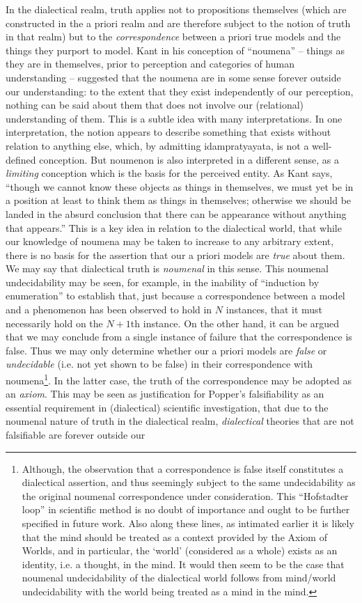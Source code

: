 \documentclass[pra,twocolumn,groupedaddress,10pt]{revtex4}
\theoremstyle{definition}
\begin{document}
In the dialectical realm, truth applies not to propositions themselves (which are constructed in the a priori realm and are therefore subject to the notion of truth in that realm) but to the \emph{correspondence} between a priori true models and the things they purport to model. Kant in his conception of ``noumena'' -- things as they are in themselves, prior to perception and categories of human understanding -- suggested that the noumena are in some sense forever outside our understanding: to the extent that they exist independently of our perception, nothing can be said about them that does not involve our (relational) understanding of them. This is a subtle idea with many interpretations. In one interpretation, the notion appears to describe something that exists without relation to anything else, which, by admitting idampratyayata, is not a well-defined conception. But noumenon is also interpreted in a different sense, as a \emph{limiting} conception which is the basis for the perceived entity. As Kant says, ``though we cannot know these objects as things in themselves, we must yet be in a position at least to think them as things in themselves; otherwise we should be landed in the absurd conclusion that there can be appearance without anything that appears.''\cite{kant} This is a key idea in relation to the dialectical world, that while our knowledge of noumena may be taken to increase to any arbitrary extent, there is no basis for the assertion that our a priori models are \emph{true} about them. We may say that dialectical truth is \emph{noumenal} in this sense. This noumenal undecidability may be seen, for example, in the inability of ``induction by enumeration'' to establish that, just because a correspondence between a model and a phenomenon has been observed to hold in $N$ instances, that it must necessarily hold on the $N+1$th instance\cite{russell}. On the other hand, it can be argued that we may conclude from a single instance of failure that the correspondence is false. Thus we may only determine whether our a priori models are \emph{false} or \emph{undecidable} (i.e. not yet shown to be false) in their correspondence with noumena\footnote{Although, the observation that a correspondence is false itself constitutes a dialectical assertion, and thus seemingly subject to the same undecidability as the original noumenal correspondence under consideration. This ``Hofstadter loop'' in scientific method is no doubt of importance and ought to be further specified in future work. Also along these lines, as intimated earlier it is likely that the mind should be treated as a context provided by the Axiom of Worlds, and in particular, the `world' (considered as a whole) exists as an identity, i.e. a thought, in the mind. It would then seem to be the case that noumenal undecidability of the dialectical world follows from mind/world undecidability with the world being treated as a mind in the mind.}. In the latter case, the truth of the correspondence may be adopted as an \emph{axiom}. This may be seen as justification for Popper's\cite{popper} falsifiability as an essential requirement in (dialectical) scientific investigation, that due to the noumenal nature of truth in the dialectical realm, \emph{dialectical} theories that are not falsifiable are forever outside our 
\end{document}
